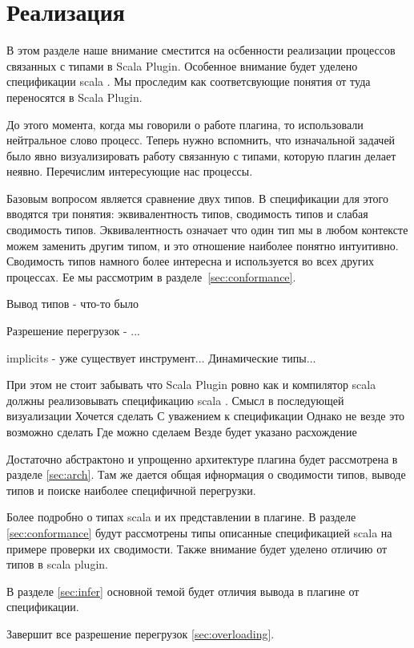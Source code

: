 \section{Реализация}

В этом разделе наше внимание сместится на осбенности реализации процессов
связанных с типами в Scala Plugin.
Особенное внимание будет уделено спецификации scala \cite{scala_spec}.
Мы проследим как соответсвующие понятия от туда переносятся в Scala Plugin.

До этого момента, когда мы говорили о работе плагина, то использовали
нейтральное слово процесс.
Теперь нужно вспомнить, что изначальной задачей было явно визуализировать
работу связанную с типами, которую плагин делает неявно.
Перечислим интересующие нас процессы.

Базовым вопросом является сравнение двух типов.
В спецификации для этого вводятся три понятия: эквивалентность типов, сводимость
типов и слабая сводимость типов.
Эквивалентность означает что один тип мы в любом контексте можем заменить другим
типом, и это отношение наиболее понятно интуитивно.
Сводимость типов намного более интересна и используется во всех других процессах.
Ее мы рассмотрим в разделе~\ref{sec:conformance}.

Вывод типов  - что-то было

Разрешение перегрузок - ...

implicits - уже существует инструмент...
Динамические типы...

При этом не стоит забывать что Scala Plugin ровно как и компилятор scala
должны реализовывать спецификацию scala \cite{scala_spec}.
Смысл в последующей визуализации
Хочется сделать С уважением к спецификации
Однако не везде это возможно сделать
Где можно сделаем
Везде будет указано расхождение

Достаточно абстрактоно и упрощенно архитектуре плагина будет
рассмотрена в разделе \ref{sec:arch}.
Там же дается общая ифнормация о сводимости типов, выводе типов и поиске
наиболее специфичной перегрузки.

Более подробно о типах scala и их представлении в плагине.
В разделе \ref{sec:conformance} будут рассмотрены типы описанные спецификацией
scala на примере проверки их сводимости. Также внимание будет уделено
отличию от типов в scala plugin.

В разделе \ref{sec:infer} основной темой будет отличия вывода в плагине от
спецификации.

Завершит все  разрешение перегрузок \ref{sec:overloading}.

